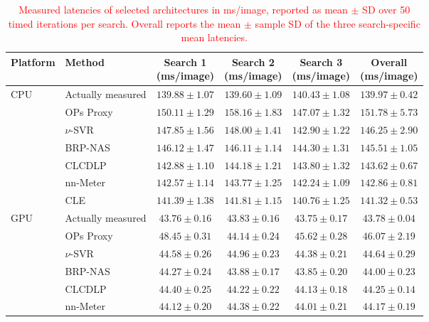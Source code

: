 \documentclass[preprint,review,12p,times]{elsarticle}
\begin{document}
\begin{table}[H]
    \centering
    \linespread{1.0}\selectfont
    \caption{\textcolor{red}{Measured latencies of selected architectures in ms/image, reported as mean $\pm$ SD over 50 timed iterations per search. Overall reports the mean $\pm$ sample SD of the three search-specific mean latencies.}}
    \label{tab:architecture_selection_repeatability}
    \small
    \setlength{\tabcolsep}{2.5pt}
    {\color{red}
    \begin{tabular}{llcccc}
    \toprule
    Platform & Method & \makecell{Search 1\\(ms/image)} & \makecell{Search 2\\(ms/image)} & \makecell{Search 3\\(ms/image)} & \makecell{Overall\\(ms/image)} \\
    \midrule
    \multirow{7}{*}{CPU} & Actually measured & $139.88\pm1.07$ & $139.60\pm1.09$ & $140.43\pm1.08$ & $139.97\pm0.42$ \\
     & OPs Proxy & $150.11\pm1.29$ & $158.16\pm1.83$ & $147.07\pm1.32$ & $151.78\pm5.73$ \\
     & $\nu$-SVR & $147.85\pm1.56$ & $148.00\pm1.41$ & $142.90\pm1.22$ & $146.25\pm2.90$ \\
     & BRP-NAS & $146.12\pm1.47$ & $146.11\pm1.14$ & $144.30\pm1.31$ & $145.51\pm1.05$ \\
     & CLCDLP & $142.88\pm1.10$ & $144.18\pm1.21$ & $143.80\pm1.32$ & $143.62\pm0.67$ \\
     & nn-Meter & $142.57\pm1.14$ & $143.77\pm1.25$ & $142.24\pm1.09$ & $142.86\pm0.81$ \\
     & CLE & $141.39\pm1.38$ & $141.81\pm1.15$ & $140.76\pm1.25$ & $141.32\pm0.53$ \\
    \midrule
    \multirow{7}{*}{GPU} & Actually measured & $43.76\pm0.16$ & $43.83\pm0.16$ & $43.75\pm0.17$ & $43.78\pm0.04$ \\
     & OPs Proxy & $48.45\pm0.31$ & $44.14\pm0.24$ & $45.62\pm0.28$ & $46.07\pm2.19$ \\
     & $\nu$-SVR & $44.58\pm0.26$ & $44.96\pm0.23$ & $44.38\pm0.21$ & $44.64\pm0.29$ \\
     & BRP-NAS & $44.27\pm0.24$ & $43.88\pm0.17$ & $43.85\pm0.20$ & $44.00\pm0.23$ \\
     & CLCDLP & $44.40\pm0.25$ & $44.22\pm0.22$ & $44.13\pm0.18$ & $44.25\pm0.14$ \\
     & nn-Meter & $44.12\pm0.20$ & $44.38\pm0.22$ & $44.01\pm0.21$ & $44.17\pm0.19$ \\

\end{tabular}}
\end{table}
\end{document}
